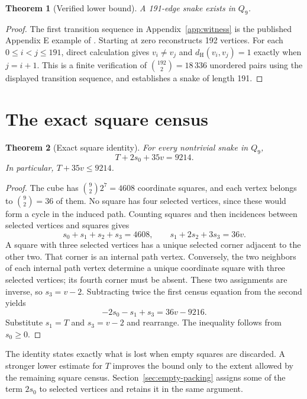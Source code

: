 \documentclass[11pt,a4paper]{article}
\newtheorem{theorem}{Theorem}[section]
\theoremstyle{definition}
\theoremstyle{remark}
\newcommand{\Q}{Q}
\newcommand{\Ham}{d_{\mathrm H}}
\begin{document}
\begin{theorem}[Verified lower bound]\label{thm:lower}
A 191-edge snake exists in $\Q_9$.
\end{theorem}
\begin{proof}
The first transition sequence in Appendix~\ref{app:witness} is the published Appendix E example of \cite{orland}. Starting at zero reconstructs 192 vertices. For each $0\le i<j\le191$, direct calculation gives $v_i\ne v_j$ and $\Ham(v_i,v_j)=1$ exactly when $j=i+1$. This is a finite verification of $\binom{192}{2}=18\,336$ unordered pairs using the displayed transition sequence, and establishes a snake of length 191.
\end{proof}

\section{The exact square census}\label{sec:incidence}
\begin{theorem}[Exact square identity]\label{thm:exact-square}
For every nontrivial snake in $\Q_9$,
\begin{equation}\label{eq:exact-square}
T+2s_0+35v=9214.
\end{equation}
In particular, $T+35v\le9214$.
\end{theorem}
\begin{proof}
The cube has $\binom92 2^7=4608$ coordinate squares, and each vertex belongs to $\binom92=36$ of them. No square has four selected vertices, since these would form a cycle in the induced path. Counting squares and then incidences between selected vertices and squares gives
\[
s_0+s_1+s_2+s_3=4608,\qquad s_1+2s_2+3s_3=36v.
\]
A square with three selected vertices has a unique selected corner adjacent to the other two. That corner is an internal path vertex. Conversely, the two neighbors of each internal path vertex determine a unique coordinate square with three selected vertices; its fourth corner must be absent. These two assignments are inverse, so $s_3=v-2$. Subtracting twice the first census equation from the second yields
\[
-2s_0-s_1+s_3=36v-9216.
\]
Substitute $s_1=T$ and $s_3=v-2$ and rearrange. The inequality follows from $s_0\ge0$.
\end{proof}

The identity states exactly what is lost when empty squares are discarded. A stronger lower estimate for $T$ improves the bound only to the extent allowed by the remaining square census. Section~\ref{sec:empty-packing} assigns some of the term $2s_0$ to selected vertices and retains it in the same argument.
\end{document}
